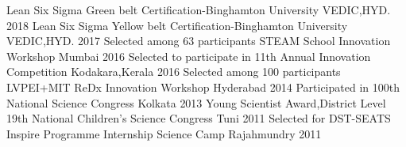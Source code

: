 \begin{cvhonors}
  \cvhonor
    {Lean Six Sigma Green belt Certification-Binghamton University}
    {}
    {VEDIC,HYD.}
    {2018}
\cvhonor
    {Lean Six Sigma Yellow belt Certification-Binghamton University}
    {}
    {VEDIC,HYD.}
    {2017}
  \cvhonor
    {Selected among 63 participants STEAM School Innovation Workshop }
    {}
    {Mumbai}
    {2016}
 \cvhonor
    {Selected to participate in 11th Annual Innovation Competition }
    {}
    {Kodakara,Kerala}
    {2016}
  \cvhonor
    {Selected among 100 participants LVPEI+MIT ReDx Innovation Workshop}
    {}
    {Hyderabad}
    {2014}
  \cvhonor
    {Participated in 100th National Science Congress}
    {}
    { Kolkata}
    {2013}
 \cvhonor
    {Young Scientist Award,District Level 19th National Children's Science Congress}
    {}
    { Tuni}
    {2011}
 \cvhonor
    {Selected for DST-SEATS Inspire Programme Internship Science Camp}
    {}
    { Rajahmundry}
    {2011}
\end{cvhonors}

